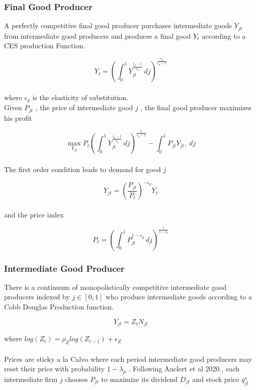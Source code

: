 \documentclass[titlepage]{\econtex}\providecommand{\texname}{BufferStockTheory}
\begin{document}
\hypertarget{Final Good Producer}{}
\subsubsection{Final Good Producer}

A perfectly competitive final good producer purchases intermediate goods $Y_{jt}$ from intermediate good producers and produces a final good $Y_{t}$ according to a CES production Function. 

$$ Y_{t} = \left(\int_{0}^{1} Y_{jt}^{\frac{\epsilon_{p}-1}{\epsilon_{p}}}\, dj\right)^{\frac{\epsilon_{p}}{\epsilon_{p}-1}}$$ \\

where $\epsilon_{p}$ is the elasticity of substitution. \\ 

Given $P_{jt}$ , the price of intermediate good $j$ ,  the final good producer maximizes his profit

$$ \max_{Y_{jt}} P_{t} \left(\int_{0}^{1} Y_{jt}^{\frac{\epsilon_{p}-1}{\epsilon_{p}}}\, dj\right)^{\frac{\epsilon_{p}}{\epsilon_{p}-1}} - \int_{0}^{1} P_{jt} Y_{jt} ,\ dj $$ \\


The first order condition leads to demand for good $j$

$$ Y_{jt} = \left(\frac {P_{jt}}{P_{t}}\right)^{- \epsilon_{p}} Y_{t}$$ \\

and the price index

$$P_{t} = \left(\int_{0}^{1} P_{jt}^{1-\epsilon_{p}}\,dj \right )^{\frac{1}{1-\epsilon_{p}}}$$


\hypertarget{Intermediate Good Producer}{}
\subsubsection{Intermediate Good Producer}

There is a continuum of  monopolistically competitive intermediate good producers indexed by $j \in [0,1]$ who produce intermediate goods according to a Cobb Douglas Production function.  

$$Y_{jt} =  Z_{t}  N_{jt}$$ 

where $log(Z_{t}) = \rho_{Z} log( Z_{t-1}) + \epsilon_{Z}$ \\ \\


Prices are sticky a la Calvo where each period intermediate good producers may reset their price with probability $ 1 -\lambda_{p}$ . Following Auclert et al 2020., each intermediate firm $j$ chooses $P_{jt}$ to maximize its dividend $D_{jt}$ and  stock price $q^{s}_{jt} $ \\ 
 
\end{document}
